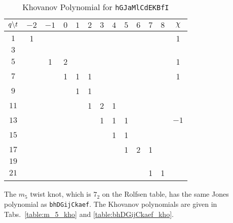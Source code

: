 \documentclass{article}
\theoremstyle{plain}
\begin{document}
        \begin{table}[H]
            \centering
            \begin{tabular}{| c | c | c | c | c | c | c | c | c | c | c | c | c |}
                \hline
                $q\symbol{92}t$&$-2$&$-1$&$0$&$1$&$2$&$3$&$4$&$5$&$6$&$7$&$8$&$\chi$\\
                \hline
                $1$&1&&&&&&&&&&&1\\
                \hline
                $3$&&&&&&&&&&&&\\
                \hline
                $5$&&1&2&&&&&&&&&1\\
                \hline
                $7$&&&1&1&1&&&&&&&1\\
                \hline
                $9$&&&&1&1&&&&&&&\\
                \hline
                $11$&&&&&1&2&1&&&&&\\
                \hline
                $13$&&&&&&1&1&1&&&&$-1$\\
                \hline
                $15$&&&&&&&1&1&&&&\\
                \hline
                $17$&&&&&&&&1&2&1&&\\
                \hline
                $19$&&&&&&&&&&&&\\
                \hline
                $21$&&&&&&&&&&1&1&\\
                \hline
            \end{tabular}
            \caption{Khovanov Polynomial for \texttt{hGJaMlCdEKBfI}}
            \label{table:hGJaMlCdEKBfI_kho}
        \end{table}
        The $m_{5}$ twist knot, which is $7_{2}$ on the Rolfsen table, has the
        same Jones polynomial as \texttt{bhDGijCkaef}. The Khovanov polynomials
        are given in Tabs.~\ref{table:m_5_kho} and \ref{table:bhDGijCkaef_kho}.
\end{document}
